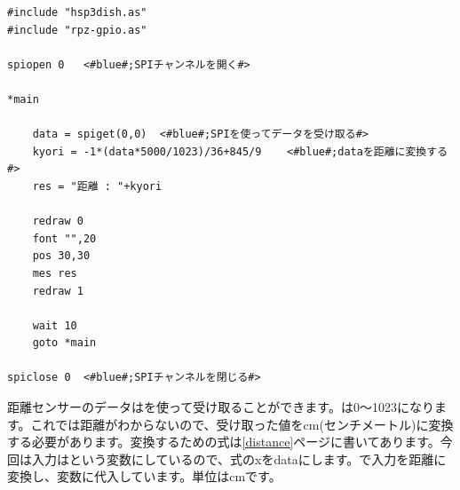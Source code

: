 \begin{lstlisting}[caption=kyori.hsp,label=kyori.hsp]
#include "hsp3dish.as"
#include "rpz-gpio.as"

spiopen 0	<#blue#;SPIチャンネルを開く#>

*main

	data = spiget(0,0)	<#blue#;SPIを使ってデータを受け取る#>
	kyori = -1*(data*5000/1023)/36+845/9	<#blue#;dataを距離に変換する#>
	res = "距離 : "+kyori
	
	redraw 0
	font "",20
	pos 30,30
	mes res
	redraw 1

	wait 10
	goto *main

spiclose 0	<#blue#;SPIチャンネルを閉じる#>
\end{lstlisting}

距離センサーのデータはを使って受け取ることができます。は0～1023になります。これでは距離がわからないので、受け取った値をcm(センチメートル)に変換する必要があります。変換するための式は\ref{distance}ページに書いてあります。今回は入力はという変数にしているので、式のxをdataにします。で入力を距離に変換し、変数に代入しています。単位はcmです。\\

\begin{tcolorbox}[title=\useOmetoi]
\begin{enumerate}
\end{enumerate}
\end{tcolorbox}
